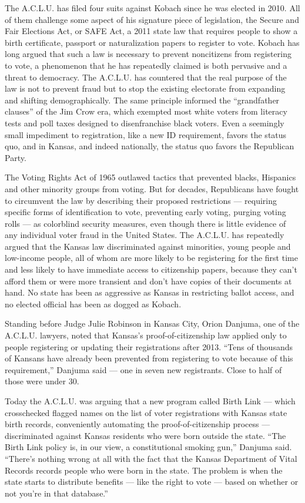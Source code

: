 The A.C.L.U. has filed four suits against Kobach since he was elected in
2010. All of them challenge some aspect of his signature piece of
legislation, the Secure and Fair Elections Act, or SAFE Act, a 2011
state law that requires people to show a birth certificate, passport or
naturalization papers to register to vote. Kobach has long argued that
such a law is necessary to prevent noncitizens from registering to vote,
a phenomenon that he has repeatedly claimed is both pervasive and a
threat to democracy. The A.C.L.U. has countered that the real purpose of
the law is not to prevent fraud but to stop the existing electorate from
expanding and shifting demographically. The same principle informed the
``grandfather clauses'' of the Jim Crow era, which exempted most white
voters from literacy tests and poll taxes designed to disenfranchise
black voters. Even a seemingly small impediment to registration, like a
new ID requirement, favors the status quo, and in Kansas, and indeed
nationally, the status quo favors the Republican Party.

The Voting Rights Act of 1965 outlawed tactics that prevented blacks,
Hispanics and other minority groups from voting. But for decades,
Republicans have fought to circumvent the law by describing their
proposed restrictions --- requiring specific forms of identification to
vote, preventing early voting, purging voting rolls --- as colorblind
security measures, even though there is little evidence of any
individual voter fraud in the United States. The A.C.L.U. has repeatedly
argued that the Kansas law discriminated against minorities, young
people and low-income people, all of whom are more likely to be
registering for the first time and less likely to have immediate access
to citizenship papers, because they can't afford them or were more
transient and don't have copies of their documents at hand. No state has
been as aggressive as Kansas in restricting ballot access, and no
elected official has been as dogged as Kobach.

Standing before Judge Julie Robinson in Kansas City, Orion Danjuma, one
of the A.C.L.U. lawyers, noted that Kansas's proof-of-citizenship law
applied only to people registering or updating their registrations after
2013. ``Tens of thousands of Kansans have already been prevented from
registering to vote because of this requirement,'' Danjuma said --- one
in seven new registrants. Close to half of those were under 30.

Today the A.C.L.U. was arguing that a new program called Birth Link ---
which crosschecked flagged names on the list of voter registrations with
Kansas state birth records, conveniently automating the
proof-of-citizenship process --- discriminated against Kansas residents
who were born outside the state. ``The Birth Link policy is, in our
view, a constitutional smoking gun,'' Danjuma said. ``There's nothing
wrong at all with the fact that the Kansas Department of Vital Records
records people who were born in the state. The problem is when the state
starts to distribute benefits --- like the right to vote --- based on
whether or not you're in that database.''

